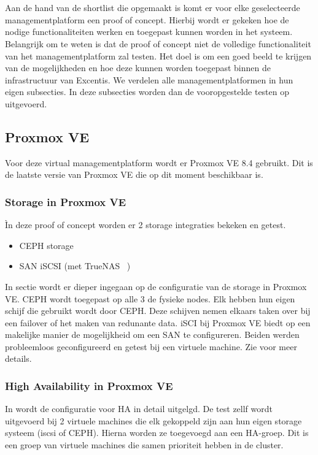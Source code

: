 
\chapter{}%
\label{ch:poc}

Aan de hand van de shortlist die opgemaakt is komt er voor elke geselecteerde managementplatform een proof of concept. Hierbij wordt er gekeken hoe de nodige functionaliteiten werken en toegepast kunnen worden in het systeem.
Belangrijk om te weten is dat de proof of concept niet de volledige functionaliteit van het managementplatform zal testen. Het doel is om een goed beeld te krijgen van de mogelijkheden en hoe deze kunnen worden toegepast binnen de infrastructuur van Excentis. 
We verdelen alle managementplatformen in hun eigen subsecties. In deze subsecties worden dan de vooropgestelde testen op uitgevoerd.
\section{Proxmox VE}%
Voor deze virtual managementplatform wordt er Proxmox VE 8.4 gebruikt. Dit is de laatste versie van Proxmox VE die op dit moment beschikbaar is.
\subsection{Storage in Proxmox VE}
Ìn deze proof of concept worden er 2 storage integraties bekeken en getest.
\begin{itemize}
    \item CEPH storage
    \item SAN iSCSI (met TrueNAS ~\autocite{truenas})
\end{itemize}
In sectie  wordt er dieper ingegaan op de configuratie van de storage in Proxmox VE.
CEPH wordt toegepast op alle 3 de fysieke nodes. Elk hebben hun eigen schijf die gebruikt wordt door CEPH. Deze schijven nemen elkaars taken over bij een failover of het maken van redunante data.
iSCI bij Proxmox VE biedt op een makelijke manier de mogelijkheid om een SAN te configureren. 
Beiden werden probleemloos geconfigureerd en getest bij een virtuele machine. Zie  voor meer details.
\subsection{High Availability in Proxmox VE}
In  wordt de configuratie voor HA in detail uitgelgd.
De test zellf wordt uitgevoerd bij 2 virtuele machines die elk gekoppeld zijn aan hun eigen storage systeem (iscsi of CEPH).
Hierna worden ze toegevoegd aan een HA-groep. Dit is een groep van virtuele machines die samen prioriteit hebben in de cluster.


